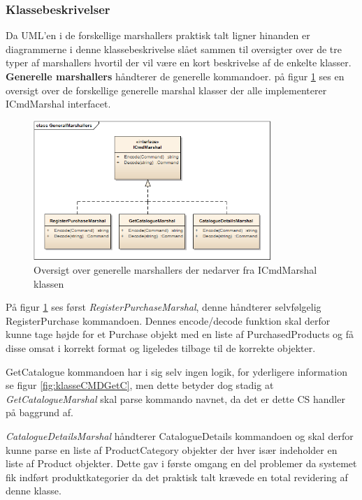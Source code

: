 \subsubsection{Klassebeskrivelser}
Da UML'en i de forskellige marshallers praktisk talt ligner hinanden er diagrammerne i denne klassebeskrivelse slået sammen til oversigter over de tre typer af marshallers hvortil der vil være en kort beskrivelse af de enkelte klasser.\\

\textbf{Generelle marshallers} håndterer de generelle kommandoer. på figur \ref{fig:overklasseMarsGen} ses en oversigt over de forskellige generelle marshal klasser der alle implementerer ICmdMarshal interfacet.

\begin{figure}[H]
	\centering
	\includegraphics[width=0.8\textwidth]{Systemdesign/SharedLib/Images/Marshallers/GeneralMarshallers2.png}
	\caption{Oversigt over generelle marshallers der nedarver fra ICmdMarshal klassen}
	\label{fig:overklasseMarsGen}
\end{figure}

På figur \ref{fig:overklasseMarsGen} ses først \textit{RegisterPurchaseMarshal}, denne håndterer selvfølgelig RegisterPurchase kommandoen. Dennes encode/decode funktion skal derfor kunne tage højde for et Purchase objekt med en liste af PurchasedProducts og få disse omsat i korrekt format og ligeledes tilbage til de korrekte objekter. 

GetCatalogue kommandoen har i sig selv ingen logik, for yderligere information se figur \ref{fig:klasseCMDGetC}, men dette betyder dog stadig at \textit{GetCatalogueMarshal} skal parse kommando navnet, da det er dette \gls{CS} handler på baggrund af. 

\textit{CatalogueDetailsMarshal} håndterer CatalogueDetails kommandoen og skal derfor kunne parse en liste af ProductCategory objekter der hver især indeholder en liste af Product objekter. Dette gav i første omgang en del problemer da systemet fik indført produktkategorier da det praktisk talt krævede en total revidering af denne klasse.\\



